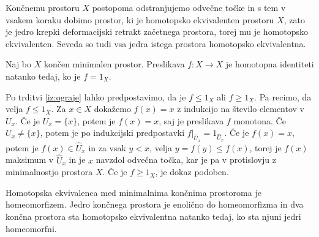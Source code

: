 \documentclass[mat1]{fmfdelo}
\begin{document}
Končnemu prostoru $X$ postopoma odstranjujemo odvečne točke in s tem v vsakem koraku dobimo prostor, ki je homotopsko ekvivalenten prostoru $X$, zato je jedro krepki deformacijski retrakt začetnega prostora, torej mu je homotopsko ekvivalenten. Seveda so tudi vsa jedra istega prostora homotopsko ekvivalentna.

\begin{izrek}
    Naj bo $X$ končen minimalen prostor. Preslikava $f\colon X\rightarrow X$ je homotopna identiteti natanko tedaj, ko je $f=1_X$.
    \label{iz:identiteta}
\end{izrek}

\begin{dokaz}
    Po trditvi \ref{iz:ograje} lahko predpostavimo, da je
    $f\leq 1_X$ ali $f\geq 1_X$. %
    Pa recimo, da velja $f\leq 1_X$. 
    Za $x\in X$ dokažemo $f(x)=x$ z indukcijo na 
    število elementov v $U_x$. Če je $U_x=\{x\}$, potem je 
    $f(x)=x$, saj je preslikava $f$ monotona. Če $U_x\neq\{x\}$, potem 
    je po indukcijski predpostavki 
    $f|_{\widehat{U}_x}=1_{\widehat{U}_x}$. Če  je $f(x)=x$, potem je 
    $f(x)\in \widehat{U}_x$ in za vsak $y < x$, velja $y=f(y)\leq 
    f(x)$, torej je $f(x)$ maksimum v $\widehat{U}_x$ in je 
    $x$ navzdol odvečna točka, kar je pa v protislovju 
    z minimalnostjo prostora $X$. Če je $f\geq 1_X$, je 
    dokaz podoben.
\end{dokaz}

\begin{posledica}
    Homotopska ekvivalenca med minimalnima končnima prostoroma je homeomorfizem. Jedro končnega prostora je enolično do homeomorfizma in dva končna prostora sta homotopsko ekvivalentna natanko tedaj, ko sta njuni jedri homeomorfni.
\end{posledica}
\end{document}
